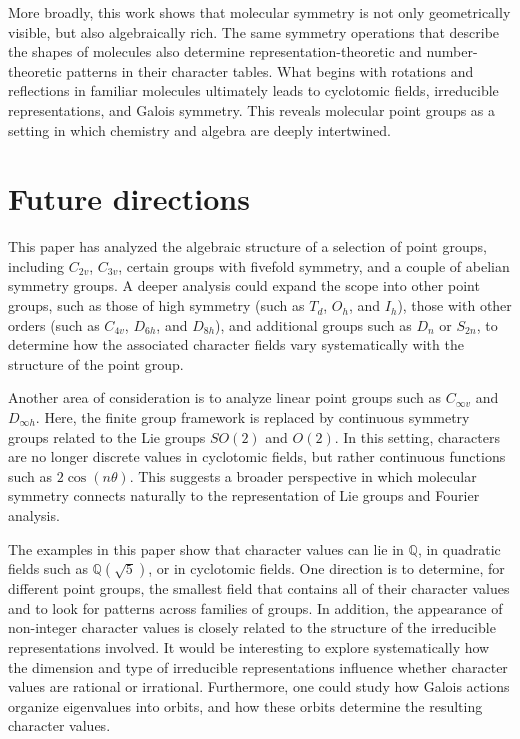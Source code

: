 \documentclass{article}
\begin{document}
    More broadly, this work shows that molecular symmetry is not only geometrically visible, but also algebraically rich. The same symmetry operations that describe the shapes of molecules also determine representation-theoretic and number-theoretic patterns in their character tables. What begins with rotations and reflections in familiar molecules ultimately leads to cyclotomic fields, irreducible representations, and Galois symmetry. This reveals molecular point groups as a setting in which chemistry and algebra are deeply intertwined.

    \section{Future directions}

    This paper has analyzed the algebraic structure of a selection of point groups, including $C_{2v}$, $C_{3v}$, certain groups with fivefold symmetry, and a couple of abelian symmetry groups. A deeper analysis could expand the scope into other point groups, such as those of high symmetry (such as $T_d$, $O_h$, and $I_h$), those with other orders (such as $C_{4v}$, $D_{6h}$, and $D_{8h}$), and additional groups such as $D_n$ or $S_{2n}$, to determine how the associated character fields vary systematically with the structure of the point group.
    
    Another area of consideration is to analyze linear point groups such as $C_{\infty v}$ and $D_{\infty h}$. Here, the finite group framework is replaced by continuous symmetry groups related to the Lie groups $SO(2)$ and $O(2)$. In this setting, characters are no longer discrete values in cyclotomic fields, but rather continuous functions such as $2\cos(n\theta)$. This suggests a broader perspective in which molecular symmetry connects naturally to the representation of Lie groups and Fourier analysis.

    The examples in this paper show that character values can lie in $\mathbb{Q}$, in quadratic fields such as $\mathbb{Q}(\sqrt{5})$, or in cyclotomic fields. One direction is to determine, for different point groups, the smallest field that contains all of their character values and to look for patterns across families of groups. In addition, the appearance of non-integer character values is closely related to the structure of the irreducible representations involved. It would be interesting to explore systematically how the dimension and type of irreducible representations influence whether character values are rational or irrational. Furthermore, one could study how Galois actions organize eigenvalues into orbits, and how these orbits determine the resulting character values.
\end{document}
